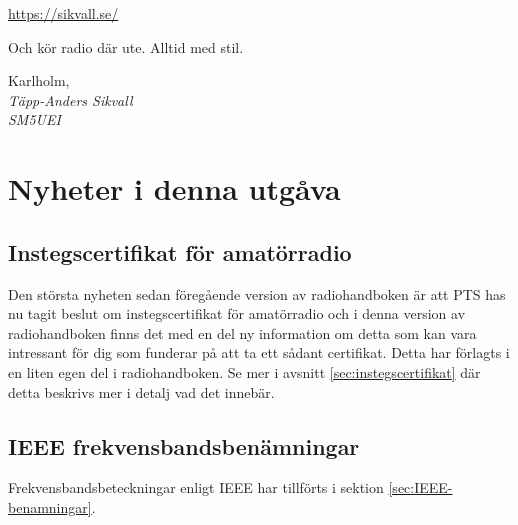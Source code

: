 \href{https://sikvall.se}{https://sikvall.se/}

Och kör radio där ute. Alltid med stil.

\vspace{4mm}

Karlholm, \DokumentDatum\\
\textit{Täpp-Anders Sikvall\\
	SM5UEI}

\clearpage

\section*{Nyheter i denna utgåva}

\subsection*{Instegscertifikat för amatörradio}

Den största nyheten sedan föregående version av radiohandboken är att PTS has nu tagit beslut om instegscertifikat för amatörradio och i denna version av radiohandboken finns det med en del ny information om detta som kan vara intressant för dig som funderar på att ta ett sådant certifikat. Detta har förlagts i en liten egen del i radiohandboken. Se mer i avsnitt \ref{sec:instegscertifikat} där detta beskrivs mer i detalj vad det innebär.

\subsection*{IEEE frekvensbandsbenämningar}

Frekvensbandsbeteckningar enligt IEEE har tillförts i sektion \ref{sec:IEEE-benamningar}.

\clearpage
	
